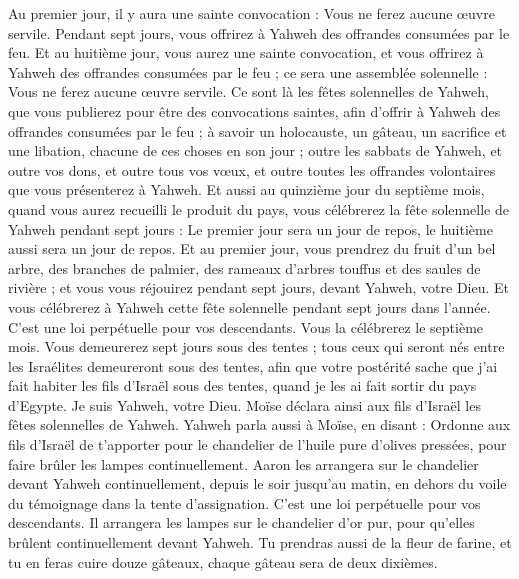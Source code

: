 \begin{multicols}{2}
Au premier jour, il y aura une sainte convocation : Vous ne ferez aucune œuvre servile.
Pendant sept jours, vous offrirez à Yahweh des offrandes consumées par le feu. Et au huitième jour, vous aurez une sainte convocation, et vous offrirez à Yahweh des offrandes consumées par le feu ; ce sera une assemblée solennelle : Vous ne ferez aucune œuvre servile.
Ce sont là les fêtes solennelles de Yahweh, que vous publierez pour être des convocations saintes, afin d'offrir à Yahweh des offrandes consumées par le feu ; à savoir un holocauste, un gâteau, un sacrifice et une libation, chacune de ces choses en son jour ;
outre les sabbats de Yahweh, et outre vos dons, et outre tous vos vœux, et outre toutes les offrandes volontaires que vous présenterez à Yahweh.
Et aussi au quinzième jour du septième mois, quand vous aurez recueilli le produit du pays, vous célébrerez la fête solennelle de Yahweh pendant sept jours : Le premier jour sera un jour de repos, le huitième aussi sera un jour de repos.
Et au premier jour, vous prendrez du fruit d'un bel arbre, des branches de palmier, des rameaux d'arbres touffus et des saules de rivière ; et vous vous réjouirez pendant sept jours, devant Yahweh, votre Dieu.
Et vous célébrerez à Yahweh cette fête solennelle pendant sept jours dans l'année. C'est une loi perpétuelle pour vos descendants. Vous la célébrerez le septième mois.
Vous demeurerez sept jours sous des tentes ; tous ceux qui seront nés entre les Israélites demeureront sous des tentes,
afin que votre postérité sache que j'ai fait habiter les fils d'Israël sous des tentes, quand je les ai fait sortir du pays d'Egypte. Je suis Yahweh, votre Dieu.
Moïse déclara ainsi aux fils d'Israël les fêtes solennelles de Yahweh.
\VerseOne{}Yahweh parla aussi à Moïse, en disant :
Ordonne aux fils d'Israël de t’apporter pour le chandelier de l'huile pure d’olives pressées, pour faire brûler les lampes continuellement.
Aaron les arrangera sur le chandelier devant Yahweh continuellement, depuis le soir jusqu’au matin, en dehors du voile du témoignage dans la tente d’assignation. C’est une loi perpétuelle pour vos descendants.
Il arrangera les lampes sur le chandelier d’or pur, pour qu’elles brûlent continuellement devant Yahweh.
Tu prendras aussi de la fleur de farine, et tu en feras cuire douze gâteaux, chaque gâteau sera de deux dixièmes.

\end{multicols}
